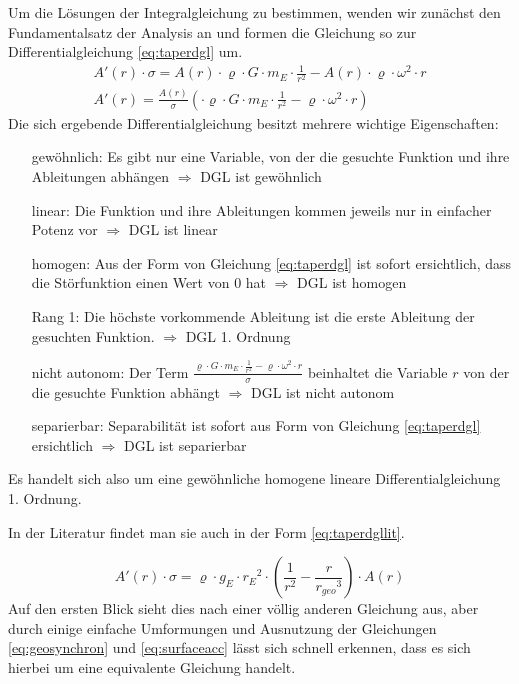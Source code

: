 \documentclass[a4paper, 10pt]{report}
\begin{document}
Um die Lösungen der Integralgleichung zu bestimmen, wenden wir zunächst den Fundamentalsatz der Analysis an und formen die Gleichung so zur Differentialgleichung \ref{eq:taperdgl} um.
\begin{align}
A'(r) \cdot \sigma = A(r) \cdot \varrho \cdot G \cdot m_E \cdot \frac{1}{r^2} - A(r) \cdot \varrho \cdot \omega^2 \cdot r \nonumber\\
A'(r) = \frac{A(r)}{\sigma} (\cdot \varrho \cdot G \cdot m_E \cdot \frac{1}{r^2} - \varrho \cdot \omega^2 \cdot r)
\label{eq:taperdgl}
\end{align}
Die sich ergebende Differentialgleichung besitzt mehrere wichtige Eigenschaften:
\begin{itemize}
[align=left]
\item[gewöhnlich:] Es gibt nur eine Variable, von der die gesuchte Funktion und ihre Ableitungen abhängen $\Rightarrow$ DGL ist gewöhnlich
\item[linear:] Die Funktion und ihre Ableitungen kommen jeweils nur in einfacher Potenz vor $\Rightarrow$ DGL ist linear
\item[homogen:] Aus der Form von Gleichung \ref{eq:taperdgl} ist sofort ersichtlich, dass die Störfunktion einen Wert von 0 hat $\Rightarrow$ DGL ist homogen
\item[Rang 1:] Die höchste vorkommende Ableitung ist die erste Ableitung der gesuchten Funktion. $\Rightarrow$ DGL 1. Ordnung
\item[nicht autonom:] Der Term $\frac{\varrho \cdot G \cdot m_E \cdot \frac{1}{r^2} - \varrho \cdot \omega^2 \cdot r}{\sigma}$ beinhaltet die Variable $r$ von der die gesuchte Funktion abhängt $\Rightarrow$ DGL ist nicht autonom
\item[separierbar:] Separabilität ist sofort aus Form von Gleichung \ref{eq:taperdgl} ersichtlich $\Rightarrow$ DGL ist separierbar
\end{itemize}
Es handelt sich also um eine gewöhnliche homogene lineare Differentialgleichung 1. Ordnung.

In der Literatur\cite{PE75} findet man sie auch in der Form \ref{eq:taperdgllit}.

\begin{equation}
A'(r) \cdot \sigma = \varrho \cdot g_E \cdot {r_E}^2 \cdot (\frac{1}{r^2} - \frac{r}{{r_{geo}}^3}) \cdot A(r)
\label{eq:taperdgllit}
\end{equation}
Auf den ersten Blick sieht dies nach einer völlig anderen Gleichung aus, aber durch einige einfache Umformungen und Ausnutzung der Gleichungen \ref{eq:geosynchron} und \ref{eq:surfaceacc} lässt sich schnell erkennen, dass es sich hierbei um eine equivalente Gleichung handelt.
\end{document}
